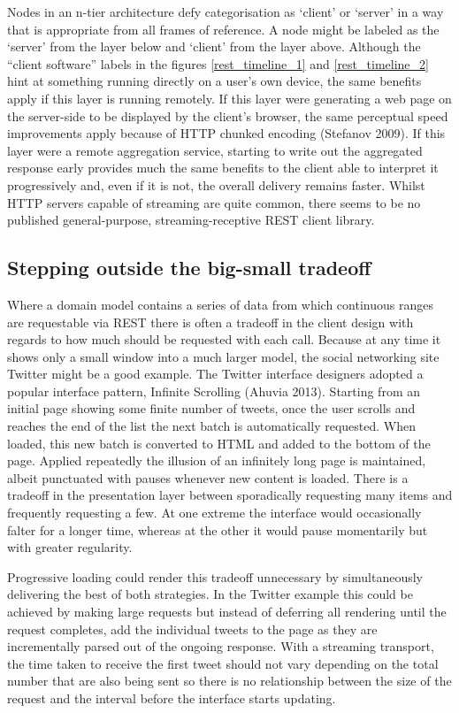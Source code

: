 \documentclass[12pt, ]{article}
\begin{document}
Nodes in an n-tier architecture defy categorisation as `client' or
`server' in a way that is appropriate from all frames of reference. A
node might be labeled as the `server' from the layer below and `client'
from the layer above. Although the ``client software'' labels in the
figures \ref{rest_timeline_1} and \ref{rest_timeline_2} hint at
something running directly on a user's own device, the same benefits
apply if this layer is running remotely. If this layer were generating a
web page on the server-side to be displayed by the client's browser, the
same perceptual speed improvements apply because of HTTP chunked
encoding (Stefanov 2009). If this layer were a remote aggregation
service, starting to write out the aggregated response early provides
much the same benefits to the client able to interpret it progressively
and, even if it is not, the overall delivery remains faster. Whilst HTTP
servers capable of streaming are quite common, there seems to be no
published general-purpose, streaming-receptive REST client library.

\subsection{Stepping outside the big-small
tradeoff}\label{stepping-outside-the-big-small-tradeoff}

Where a domain model contains a series of data from which continuous
ranges are requestable via REST there is often a tradeoff in the client
design with regards to how much should be requested with each call.
Because at any time it shows only a small window into a much larger
model, the social networking site Twitter might be a good example. The
Twitter interface designers adopted a popular interface pattern,
Infinite Scrolling (Ahuvia 2013). Starting from an initial page showing
some finite number of tweets, once the user scrolls and reaches the end
of the list the next batch is automatically requested. When loaded, this
new batch is converted to HTML and added to the bottom of the page.
Applied repeatedly the illusion of an infinitely long page is
maintained, albeit punctuated with pauses whenever new content is
loaded. There is a tradeoff in the presentation layer between
sporadically requesting many items and frequently requesting a few. At
one extreme the interface would occasionally falter for a longer time,
whereas at the other it would pause momentarily but with greater
regularity.

Progressive loading could render this tradeoff unnecessary by
simultaneously delivering the best of both strategies. In the Twitter
example this could be achieved by making large requests but instead of
deferring all rendering until the request completes, add the individual
tweets to the page as they are incrementally parsed out of the ongoing
response. With a streaming transport, the time taken to receive the
first tweet should not vary depending on the total number that are also
being sent so there is no relationship between the size of the request
and the interval before the interface starts updating.
\end{document}
